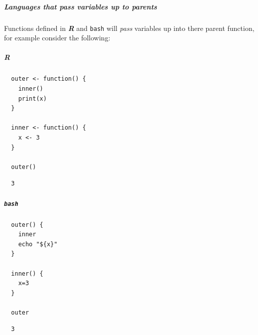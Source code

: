 \documentclass[11pt]{article}
\begin{document}
\subparagraph{Languages that pass variables up to parents}
\label{languages-that-pass-variables-up-to-parents}
Functions defined in \textbf{\emph{R}} and \texttt{bash} will \emph{pass} variables up into
there parent function, for example consider the following:

\subparagraph{\textbf{\emph{R}}}
\label{r}
\begin{verbatim}
  outer <- function() {
    inner()
    print(x)
  }

  inner <- function() {
    x <- 3
  }

  outer()
\end{verbatim}

\begin{verbatim}
  3
\end{verbatim}

\subparagraph{\texttt{bash}}
\label{bash}
\begin{verbatim}
  outer() {
    inner
    echo "${x}"
  }

  inner() {
    x=3
  }

  outer
\end{verbatim}

\begin{verbatim}
  3
\end{verbatim}
\end{document}
